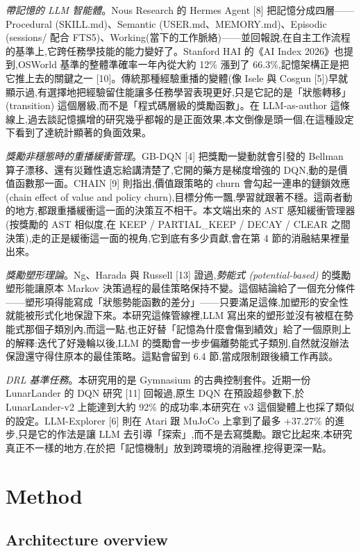 \documentclass[conference,onecolumn,letterpaper,10pt]{IEEEtran}
\begin{document}
\emph{帶記憶的 LLM 智能體}。Nous Research 的 Hermes Agent {[}8{]} 把記憶分成四層------Procedural (SKILL.md)、Semantic (USER.md、MEMORY.md)、Episodic (sessions/ 配合 FTS5)、Working(當下的工作脈絡)------並回報說,在自主工作流程的基準上,它跨任務學技能的能力變好了。Stanford HAI 的《AI Index 2026》也提到,OSWorld 基準的整體準確率一年內從大約 12\% 漲到了 66.3\%,記憶架構正是把它推上去的關鍵之一 {[}10{]}。傳統那種經驗重播的變體(像 Isele 與 Cosgun {[}5{]})早就顯示過,有選擇地把經驗留住能讓多任務學習表現更好,只是它記的是「狀態轉移」(transition) 這個層級,而不是「程式碼層級的獎勵函數」。在 LLM-as-author 這條線上,過去談記憶擴增的研究幾乎都報的是正面效果,本文倒像是頭一個,在這種設定下看到了達統計顯著的負面效果。

\emph{獎勵非穩態時的重播緩衝管理}。GB-DQN {[}4{]} 把獎勵一變動就會引發的 Bellman 算子漂移、還有災難性遺忘給講清楚了,它開的藥方是梯度增強的 DQN,動的是價值函數那一面。CHAIN {[}9{]} 則指出,價值跟策略的 churn 會勾起一連串的鏈鎖效應 (chain effect of value and policy churn),目標分佈一飄,學習就跟著不穩。這兩者動的地方,都跟重播緩衝這一面的決策互不相干。本文端出來的 AST 感知緩衝管理器(按獎勵的 AST 相似度,在 KEEP / PARTIAL\_KEEP / DECAY / CLEAR 之間決策),走的正是緩衝這一面的視角,它到底有多少貢獻,會在第 4 節的消融結果裡量出來。

\emph{獎勵塑形理論}。Ng、Harada 與 Russell {[}13{]} 證過,\emph{勢能式 (potential-based)} 的獎勵塑形能讓原本 Markov 決策過程的最佳策略保持不變。這個結論給了一個充分條件------塑形項得能寫成「狀態勢能函數的差分」------只要滿足這條,加塑形的安全性就能被形式化地保證下來。本研究這條管線裡,LLM 寫出來的塑形並沒有被框在勢能式那個子類別內,而這一點,也正好替「記憶為什麼會傷到績效」給了一個原則上的解釋:迭代了好幾輪以後,LLM 的獎勵會一步步偏離勢能式子類別,自然就沒辦法保證還守得住原本的最佳策略。這點會留到 6.4 節,當成限制跟後續工作再談。

\emph{DRL 基準任務}。本研究用的是 Gymnasium 的古典控制套件。近期一份 LunarLander 的 DQN 研究 {[}11{]} 回報過,原生 DQN 在預設超參數下,於 LunarLander-v2 上能達到大約 92\% 的成功率,本研究在 v3 這個變體上也採了類似的設定。LLM-Explorer {[}6{]} 則在 Atari 跟 MuJoCo 上拿到了最多 +37.27\% 的進步,只是它的作法是讓 LLM 去引導「探索」,而不是去寫獎勵。跟它比起來,本研究真正不一樣的地方,在於把「記憶機制」放到跨環境的消融裡,挖得更深一點。


\section{Method}

\subsection{Architecture overview}
\end{document}
